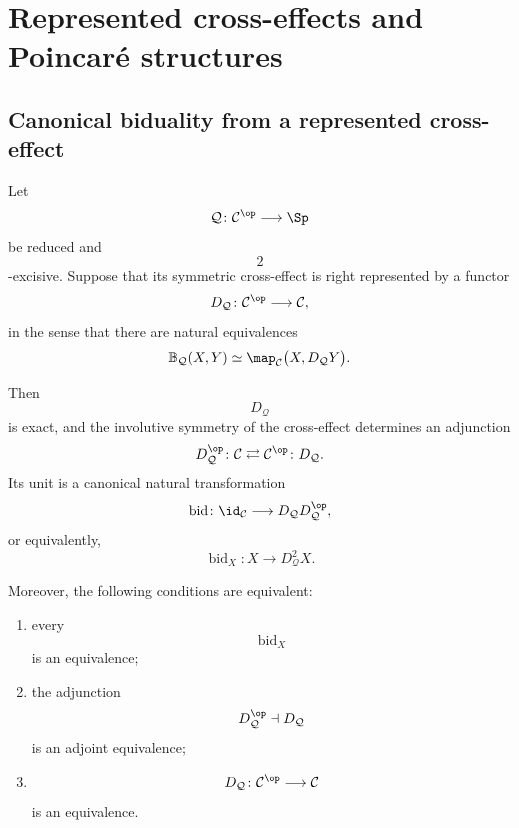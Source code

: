 \section{Represented cross-effects and Poincar\'e structures}
\label{sec:represented-cross-effects-poincare}

\subsection{Canonical biduality from a represented cross-effect}

\begin{proposition}
\label{prop:canonical-biduality-from-cross-effect}
Let
\[
    \mathcal Q
    \colon
    \mathcal C^{\op}
    \longrightarrow
    \Sp
\]
be reduced and
\[
    2
\]
-excisive. Suppose that its symmetric cross-effect is right represented by
a functor
\[
    D_{\mathcal Q}
    \colon
    \mathcal C^{\op}
    \longrightarrow
    \mathcal C,
\]
in the sense that there are natural equivalences
\[
    \mathbb B_{\mathcal Q}(X,Y)
    \simeq
    \map_{\mathcal C}
    \bigl(
        X,
        D_{\mathcal Q}Y
    \bigr).
\]

Then
\[
    D_{\mathcal Q}
\]
is exact, and the involutive symmetry of the cross-effect determines an
adjunction
\[
    D_{\mathcal Q}^{\op}
    \colon
    \mathcal C
    \rightleftarrows
    \mathcal C^{\op}
    \colon
    D_{\mathcal Q}.
\]
Its unit is a canonical natural transformation
\[
    \operatorname{bid}
    \colon
    \id_{\mathcal C}
    \longrightarrow
    D_{\mathcal Q}D_{\mathcal Q}^{\op},
\]
or equivalently,
\[
    \operatorname{bid}_X
    \colon
    X
    \longrightarrow
    D_{\mathcal Q}^{2}X.
\]

Moreover, the following conditions are equivalent:
\begin{enumerate}[label=(\roman*)]
    \item every
    \[
        \operatorname{bid}_X
    \]
    is an equivalence;

    \item the adjunction
    \[
        D_{\mathcal Q}^{\op}
        \dashv
        D_{\mathcal Q}
    \]
    is an adjoint equivalence;

    \item
    \[
        D_{\mathcal Q}
        \colon
        \mathcal C^{\op}
        \longrightarrow
        \mathcal C
    \]
    is an equivalence.
\end{enumerate}
\end{proposition}

